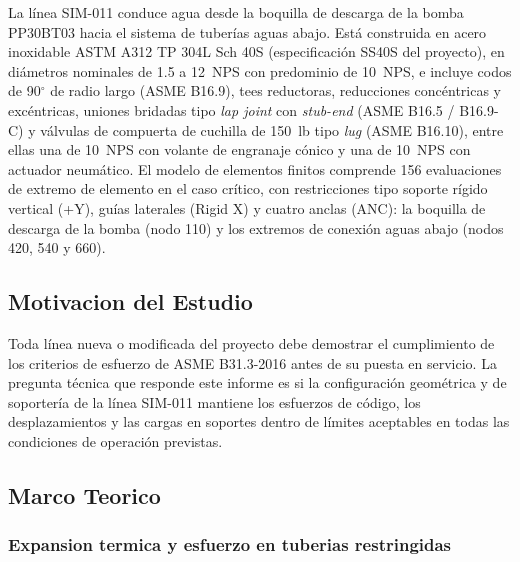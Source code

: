 La l\'{i}nea SIM-011 conduce agua desde la boquilla de descarga de la bomba
PP30BT03 hacia el sistema de tuber\'{i}as aguas abajo. Est\'{a} construida en
acero inoxidable ASTM A312 TP 304L Sch 40S (especificaci\'{o}n SS40S del
proyecto), en di\'{a}metros nominales de 1.5 a 12~NPS con predominio de 10~NPS,
e incluye codos de 90$^\circ$ de radio largo (ASME B16.9), tees reductoras,
reducciones conc\'{e}ntricas y exc\'{e}ntricas, uniones bridadas tipo
\textit{lap joint} con \textit{stub-end} (ASME B16.5 / B16.9-C) y v\'{a}lvulas
de compuerta de cuchilla de 150~lb tipo \textit{lug} (ASME B16.10), entre ellas
una de 10~NPS con volante de engranaje c\'{o}nico y una de 10~NPS con actuador
neum\'{a}tico. El modelo de elementos finitos comprende 156 evaluaciones de
extremo de elemento en el caso cr\'{i}tico, con restricciones tipo soporte
r\'{i}gido vertical (+Y), gu\'{i}as laterales (Rigid X) y cuatro anclas (ANC):
la boquilla de descarga de la bomba (nodo 110) y los extremos de conexi\'{o}n
aguas abajo (nodos 420, 540 y 660).

\subsection{Motivacion del Estudio}

Toda l\'{i}nea nueva o modificada del proyecto debe demostrar el cumplimiento de
los criterios de esfuerzo de ASME B31.3-2016 antes de su puesta en servicio.
La pregunta t\'{e}cnica que responde este informe es si la configuraci\'{o}n
geom\'{e}trica y de soporter\'{i}a de la l\'{i}nea SIM-011 mantiene los esfuerzos
de c\'{o}digo, los desplazamientos y las cargas en soportes dentro de l\'{i}mites
aceptables en todas las condiciones de operaci\'{o}n previstas.

\subsection{Marco Teorico}
\label{ssec:marco}

\subsubsection{Expansion termica y esfuerzo en tuberias restringidas}

